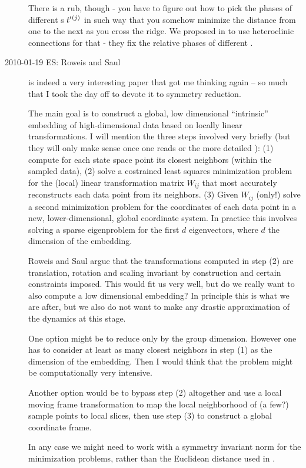\begin{description}
There is a rub, though - you have to figure out how to pick the phases of
different \template s $t'_{}{}^{(j)}$ in such way that you somehow
minimize the distance from one to the next as you cross the ridge. We
proposed in  to use heteroclinic connections for that - they
fix the relative phases of different \eqva.


 \item[2010-01-19 ES: Roweis and Saul\rf{RoSa00}] is indeed a very interesting
  paper that got me thinking again -- so much that I took the day off to devote
  it to symmetry reduction.

  The main goal is to construct a global, low dimensional ``intrinsic''
  embedding of high-dimensional data based on locally linear transformations.
  I will mention the three steps involved very briefly (but they will only make
  sense once one reads  or the more detailed ):
  (1) compute for each state space point its
  closest neighbors (within the sampled data), (2) solve a costrained
  least squares minimization problem for the (local) linear transformation
  matrix $W_{ij}$ that most accurately reconstructs each data point
  from its neighbors. (3) Given $W_{ij}$ (only!) solve a second minimization
  problem for the coordinates of each data point in a new, lower-dimensional,
  global coordinate system. In practice this involves solving a sparse
  eigenproblem for the first $d$ eigenvectors, where $d$ the dimension of
  the embedding.

  Roweis and Saul argue that the transformations computed in step (2) are
  translation, rotation and scaling invariant by construction and certain
  constraints imposed. This would fit us very well, but do we really want
  to also compute a low dimensional embedding? In principle this is what we are
  after, but we also do not want to make any drastic approximation of the
  dynamics at this stage.

  One option might be to reduce only by the group dimension.
  However one has to consider at least as many closest neighbors
  in step (1) as the dimension of the embedding. Then I would think that
  the problem might be computationally very intensive.

  Another option would be to bypass step (2) altogether and use a local
  moving frame transformation to map the local neighborhood of (a few?)
  sample points to local slices, then use step (3) to construct a global
  coordinate frame.

  In any case we might need to work with a symmetry invariant norm for the
  minimization problems, rather than the Euclidean distance used in .


\end{description}
